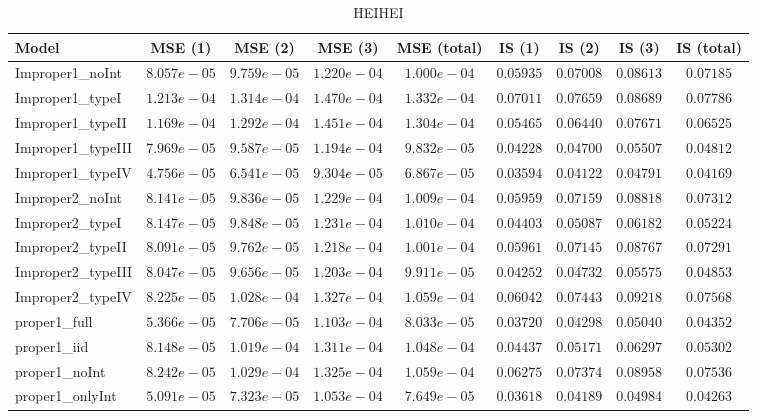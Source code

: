 \begin{table}

\caption{\label{tab:model-choice-sc8}HEIHEI}
\centering
\begin{tabular}{lcccccccc}
\hline
Model  & MSE (1) & MSE (2) & MSE (3) & MSE (total) & IS (1) & IS (2) & IS (3) & \multicolumn{1}{c}{IS (total)} \\ 
\hline
Improper1_noInt  & $8.057e-05$ & $9.759e-05$ & $1.220e-04$ & $1.000e-04$ & $0.05935$ & $0.07008$ & $0.08613$ & $0.07185$ \\
Improper1_typeI  & $1.213e-04$ & $1.314e-04$ & $1.470e-04$ & $1.332e-04$ & $0.07011$ & $0.07659$ & $0.08689$ & $0.07786$ \\
Improper1_typeII  & $1.169e-04$ & $1.292e-04$ & $1.451e-04$ & $1.304e-04$ & $0.05465$ & $0.06440$ & $0.07671$ & $0.06525$ \\
Improper1_typeIII  & $7.969e-05$ & $9.587e-05$ & $1.194e-04$ & $9.832e-05$ & $0.04228$ & $0.04700$ & $0.05507$ & $0.04812$ \\
Improper1_typeIV  & $4.756e-05$ & $6.541e-05$ & $9.304e-05$ & $6.867e-05$ & $0.03594$ & $0.04122$ & $0.04791$ & $0.04169$ \\
Improper2_noInt  & $8.141e-05$ & $9.836e-05$ & $1.229e-04$ & $1.009e-04$ & $0.05959$ & $0.07159$ & $0.08818$ & $0.07312$ \\
Improper2_typeI  & $8.147e-05$ & $9.848e-05$ & $1.231e-04$ & $1.010e-04$ & $0.04403$ & $0.05087$ & $0.06182$ & $0.05224$ \\
Improper2_typeII  & $8.091e-05$ & $9.762e-05$ & $1.218e-04$ & $1.001e-04$ & $0.05961$ & $0.07145$ & $0.08767$ & $0.07291$ \\
Improper2_typeIII  & $8.047e-05$ & $9.656e-05$ & $1.203e-04$ & $9.911e-05$ & $0.04252$ & $0.04732$ & $0.05575$ & $0.04853$ \\
Improper2_typeIV  & $8.225e-05$ & $1.028e-04$ & $1.327e-04$ & $1.059e-04$ & $0.06042$ & $0.07443$ & $0.09218$ & $0.07568$ \\
proper1_full  & $5.366e-05$ & $7.706e-05$ & $1.103e-04$ & $8.033e-05$ & $0.03720$ & $0.04298$ & $0.05040$ & $0.04352$ \\
proper1_iid  & $8.148e-05$ & $1.019e-04$ & $1.311e-04$ & $1.048e-04$ & $0.04437$ & $0.05171$ & $0.06297$ & $0.05302$ \\
proper1_noInt  & $8.242e-05$ & $1.029e-04$ & $1.325e-04$ & $1.059e-04$ & $0.06275$ & $0.07374$ & $0.08958$ & $0.07536$ \\
proper1_onlyInt  & $5.091e-05$ & $7.323e-05$ & $1.053e-04$ & $7.649e-05$ & $0.03618$ & $0.04189$ & $0.04984$ & $0.04263$ \\

\end{tabular}
\end{table}
